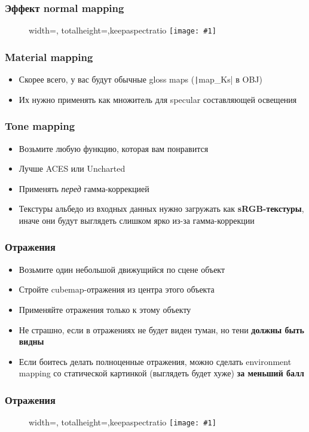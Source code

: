 \documentclass[10pt]{beamer}
\newcommand{\slideimage}[1]{
  \begin{figure}
    \begin{adjustbox}{width=\textwidth, totalheight=\textheight-2\baselineskip-2\baselineskip,keepaspectratio}
      \texttt{[image: \#1]}
    \end{adjustbox}
  \end{figure}
}
\begin{document}
\begin{frame}[fragile]
\frametitle{Эффект normal mapping}
\slideimage{normal_map.png}
\end{frame}

\begin{frame}[fragile]
\frametitle{Material mapping}
\begin{itemize}
\item Скорее всего, у вас будут обычные gloss maps (\texttt|map_Ks| в OBJ)
\pause
\item Их нужно применять как множитель для specular составляющей освещения
\end{itemize}
\end{frame}

\begin{frame}[fragile]
\frametitle{Tone mapping}
\begin{itemize}
\item Возьмите любую функцию, которая вам понравится
\pause
\item Лучше ACES или Uncharted
\pause
\item Применять \textit{перед} гамма-коррекцией
\pause
\item Текстуры альбедо из входных данных нужно загружать как \textbf{sRGB-текстуры}, иначе они будут выглядеть слишком ярко из-за гамма-коррекции
\end{itemize}
\end{frame}

\begin{frame}[fragile]
\frametitle{Отражения}
\begin{itemize}
\item Возьмите один небольшой движущийся по сцене объект
\pause
\item Стройте cubemap-отражения из центра этого объекта
\pause
\item Применяйте отражения только к этому объекту
\pause
\item Не страшно, если в отражениях не будет виден туман, но тени \textbf{должны быть видны}
\pause
\item Если боитесь делать полноценные отражения, можно сделать environment mapping со статической картинкой (выглядеть будет хуже) \textbf{за меньший балл}
\end{itemize}
\end{frame}

\begin{frame}[fragile]
\frametitle{Отражения}
\slideimage{reflection.png}
\end{frame}
\end{document}
